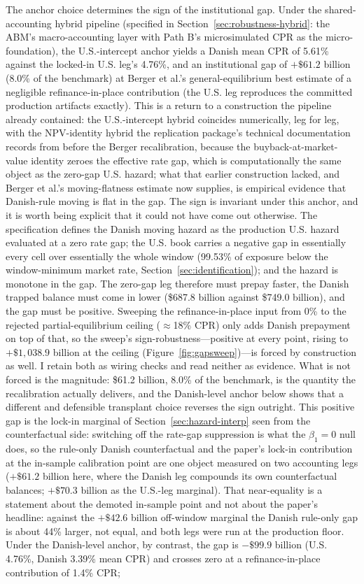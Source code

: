 \documentclass[12pt]{article}
\begin{document}
The anchor choice determines the sign of the institutional gap. Under the shared-accounting hybrid pipeline (specified in Section~\ref{sec:robustness-hybrid}: the ABM's macro-accounting layer with Path B's microsimulated CPR as the micro-foundation), the U.S.-intercept anchor yields a Danish mean CPR of 5.61\% against the locked-in U.S. leg's 4.76\%, and an institutional gap of $+\$61.2$ billion (8.0\% of the benchmark) at Berger et al.'s general-equilibrium best estimate of a negligible refinance-in-place contribution (the U.S. leg reproduces the committed production artifacts exactly). This is a return to a construction the pipeline already contained: the U.S.-intercept hybrid coincides numerically, leg for leg, with the NPV-identity hybrid the replication package's technical documentation records from before the Berger recalibration, because the buyback-at-market-value identity zeroes the effective rate gap, which is computationally the same object as the zero-gap U.S. hazard; what that earlier construction lacked, and Berger et al.'s moving-flatness estimate now supplies, is empirical evidence that Danish-rule moving is flat in the gap. The sign is invariant under this anchor, and it is worth being explicit that it could not have come out otherwise. The specification defines the Danish moving hazard as the production U.S. hazard evaluated at a zero rate gap; the U.S. book carries a negative gap in essentially every cell over essentially the whole window (99.53\% of exposure below the window-minimum market rate, Section~\ref{sec:identification}); and the hazard is monotone in the gap. The zero-gap leg therefore must prepay faster, the Danish trapped balance must come in lower (\$687.8 billion against \$749.0 billion), and the gap must be positive. Sweeping the refinance-in-place input from 0\% to the rejected partial-equilibrium ceiling ($\approx$18\% CPR) only adds Danish prepayment on top of that, so the sweep's sign-robustness---positive at every point, rising to $+\$1{,}038.9$ billion at the ceiling (Figure~\ref{fig:gapsweep})---is forced by construction as well. I retain both as wiring checks and read neither as evidence. What is not forced is the magnitude: \$61.2 billion, 8.0\% of the benchmark, is the quantity the recalibration actually delivers, and the Danish-level anchor below shows that a different and defensible transplant choice reverses the sign outright. This positive gap is the lock-in marginal of Section~\ref{sec:hazard-interp} seen from the counterfactual side: switching off the rate-gap suppression is what the $\beta_1 = 0$ null does, so the rule-only Danish counterfactual and the paper's lock-in contribution at the in-sample calibration point are one object measured on two accounting legs ($+\$61.2$ billion here, where the Danish leg compounds its own counterfactual balances; $+\$70.3$ billion as the U.S.-leg marginal). That near-equality is a statement about the demoted in-sample point and not about the paper's headline: against the $+\$42.6$ billion off-window marginal the Danish rule-only gap is about 44\% larger, not equal, and both legs were run at the production floor. Under the Danish-level anchor, by contrast, the gap is $-\$99.9$ billion (U.S. 4.76\%, Danish 3.39\% mean CPR) and crosses zero at a refinance-in-place contribution of 1.4\% CPR; 
\end{document}
